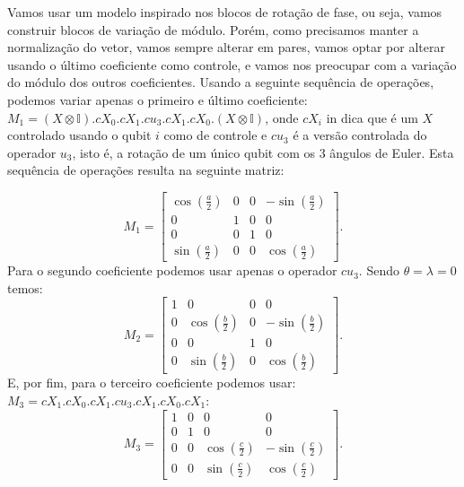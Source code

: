Vamos usar um modelo inspirado nos blocos de rotação de fase, ou seja, vamos construir blocos de variação de módulo. Porém, como precisamos manter a normalização do vetor, vamos sempre alterar em pares, vamos optar por alterar usando o último coeficiente como controle, e vamos nos preocupar com a variação do módulo dos outros coeficientes. Usando a seguinte sequência de operações, podemos variar apenas o primeiro e último coeficiente: $M_1=\left(X\otimes\mathbb{I}\right).cX_{0}.cX_{1}.cu_{3}.cX_{1}.cX_{0}.\left(X\otimes\mathbb{I}\right)$, onde $cX_i$ in dica que é um $X$ controlado usando o qubit $i$ como de controle e $cu_3$  é a versão controlada do operador $u_3$, isto é, a rotação de um único qubit com os 3 ângulos de Euler. Esta sequência de operações resulta na seguinte matriz:

\begin{equation}
M_1=\left[\begin{array}{cccc}
\cos\left(\frac{a}{2}\right) & 0 & 0 & -\sin\left(\frac{a}{2}\right)\\
0 & 1 & 0 & 0\\
0 & 0 & 1 & 0\\
\sin\left(\frac{a}{2}\right) & 0 & 0 & \cos\left(\frac{a}{2}\right)
\end{array}\right]
. \end{equation}
Para o segundo coeficiente podemos usar apenas o operador $cu_3.$ Sendo $\theta=\lambda=0$ temos:
\begin{equation}
M_2=\left[\begin{array}{cccc}
1 & 0 & 0 & 0\\
0 & \cos\left(\frac{b}{2}\right) & 0 & -\sin\left(\frac{b}{2}\right)\\
0 & 0 & 1 & 0\\
0 & \sin\left(\frac{b}{2}\right) & 0 & \cos\left(\frac{b}{2}\right)
\end{array}\right]
. \end{equation}
E, por fim, para o terceiro coeficiente podemos usar: $M_3=cX_{1}.cX_{0}.cX_{1}.cu_{3}.cX_{1}.cX_{0}.cX_{1}$:
\begin{equation}
M_3=\left[\begin{array}{cccc}
1 & 0 & 0 & 0\\
0 & 1 & 0 & 0\\
0 & 0 & \cos\left(\frac{c}{2}\right) & -\sin\left(\frac{c}{2}\right)\\
0 & 0 & \sin\left(\frac{c}{2}\right) & \cos\left(\frac{c}{2}\right)
\end{array}\right]
. \end{equation}
